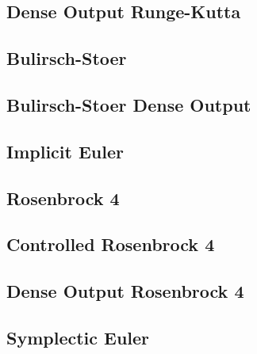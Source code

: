 \lipsum[2]


\subsection{Dense Output Runge-Kutta}
\label{Dense Output Runge-Kutta}

\lipsum[2]


\subsection{Bulirsch-Stoer}
\label{Bulirsch-Stoer}

\lipsum[4]


\subsection{Bulirsch-Stoer Dense Output}
\label{Bulirsch-Stoer Dense Output}

\lipsum[4]



\subsection{Implicit Euler}
\label{Implicit Euler}

\lipsum[2]


\subsection{Rosenbrock 4}
\label{Rosenbrock 4}

\lipsum[2]


\subsection{Controlled Rosenbrock 4}
\label{Controlled Rosenbrock 4}

\lipsum[2]


\subsection{Dense Output Rosenbrock 4}
\label{Dense Output Rosenbrock 4}

\lipsum[2]


\subsection{Symplectic Euler}
\label{Symplectic Euler}

\lipsum[2]


